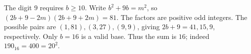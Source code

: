The digit $9$ requires $b\ge10$. Write $b^2+9b=m^2$, so $(2b+9-2m)(2b+9+2m)=81$. The factors are positive odd integers. The possible pairs are $(1,81),(3,27),(9,9)$, giving $2b+9=41,15,9$, respectively. Only $b=16$ is a valid base. Thus the sum is $\boxed{16}$; indeed $190_{16}=400=20^2$.
